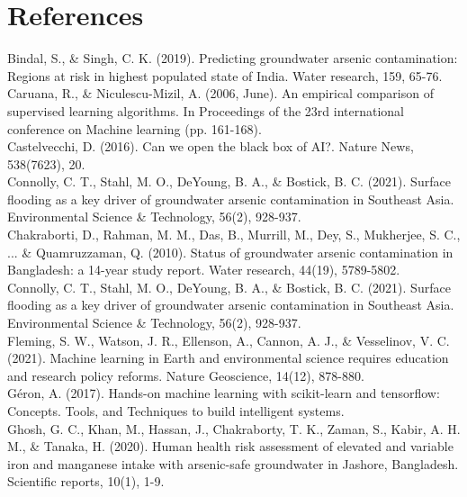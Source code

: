 \chapter{References}

Bindal, S., \& Singh, C. K. (2019). Predicting groundwater arsenic contamination: Regions at risk in highest populated state of India. Water research, 159, 65-76.\\

Caruana, R., \& Niculescu-Mizil, A. (2006, June). An empirical comparison of supervised learning algorithms. In Proceedings of the 23rd international conference on Machine learning (pp. 161-168).\\

Castelvecchi, D. (2016). Can we open the black box of AI?. Nature News, 538(7623), 20.\\

Connolly, C. T., Stahl, M. O., DeYoung, B. A., \& Bostick, B. C. (2021). Surface flooding as a key driver of groundwater arsenic contamination in Southeast Asia. Environmental Science \& Technology, 56(2), 928-937.\\

Chakraborti, D., Rahman, M. M., Das, B., Murrill, M., Dey, S., Mukherjee, S. C., ... \& Quamruzzaman, Q. (2010). Status of groundwater arsenic contamination in Bangladesh: a 14-year study report. Water research, 44(19), 5789-5802.\\

Connolly, C. T., Stahl, M. O., DeYoung, B. A., \& Bostick, B. C. (2021). Surface flooding as a key driver of groundwater arsenic contamination in Southeast Asia. Environmental Science \& Technology, 56(2), 928-937.\\

Fleming, S. W., Watson, J. R., Ellenson, A., Cannon, A. J., \& Vesselinov, V. C. (2021). Machine learning in Earth and environmental science requires education and research policy reforms. Nature Geoscience, 14(12), 878-880.\\

Géron, A. (2017). Hands-on machine learning with scikit-learn and tensorflow: Concepts. Tools, and Techniques to build intelligent systems.\\

Ghosh, G. C., Khan, M., Hassan, J., Chakraborty, T. K., Zaman, S., Kabir, A. H. M., \& Tanaka, H. (2020). Human health risk assessment of elevated and variable iron and manganese intake with arsenic-safe groundwater in Jashore, Bangladesh. Scientific reports, 10(1), 1-9.\\

